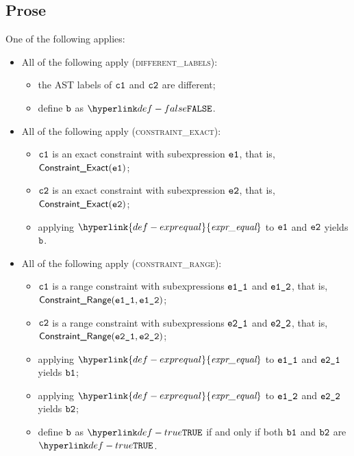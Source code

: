 \documentclass{book}
\newcommand\ProseOrTypeError[0]{\ProseTerminateAs{\TypeErrorConfig}}
\newcommand\exprequal[0]{\hyperlink{def-exprequal}{\textfunc{expr\_equal}}}
\begin{document}
\subsection{Prose}
One of the following applies:
\begin{itemize}
  \item All of the following apply (\textsc{different\_labels}):
  \begin{itemize}
    \item the AST labels of $\texttt{c1}$ and $\texttt{c2}$ are different;
    \item define $\texttt{b}$ as $\False$.
  \end{itemize}

  \item All of the following apply (\textsc{constraint\_exact}):
  \begin{itemize}
    \item $\texttt{c1}$ is an exact constraint with subexpression $\texttt{e1}$, that is, $\textsf{Constraint\_Exact}(\texttt{e1})$;
    \item $\texttt{c2}$ is an exact constraint with subexpression $\texttt{e2}$, that is, $\textsf{Constraint\_Exact}(\texttt{e2})$;
    \item applying $\exprequal$ to $\texttt{e1}$ and $\texttt{e2}$ yields $\texttt{b}$\ProseOrTypeError.
  \end{itemize}

  \item All of the following apply (\textsc{constraint\_range}):
  \begin{itemize}
    \item $\texttt{c1}$ is a range constraint with subexpressions $\texttt{e1\_1}$ and $\texttt{e1\_2}$, that is, \\ $\textsf{Constraint\_Range}(\texttt{e1\_1}, \texttt{e1\_2})$;
    \item $\texttt{c2}$ is a range constraint with subexpressions $\texttt{e2\_1}$ and $\texttt{e2\_2}$, that is, \\ $\textsf{Constraint\_Range}(\texttt{e2\_1}, \texttt{e2\_2})$;
    \item applying $\exprequal$ to $\texttt{e1\_1}$ and $\texttt{e2\_1}$ yields $\texttt{b1}$\ProseOrTypeError;
    \item applying $\exprequal$ to $\texttt{e1\_2}$ and $\texttt{e2\_2}$ yields $\texttt{b2}$\ProseOrTypeError;
    \item define $\texttt{b}$ as $\True$ if and only if both $\texttt{b1}$ and $\texttt{b2}$ are $\True$.
  \end{itemize}
\end{itemize}
\end{document}
